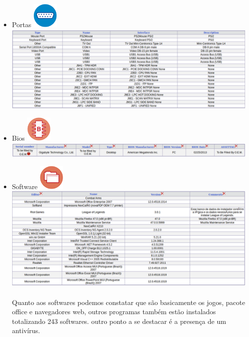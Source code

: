\documentclass[a4paper]{article}
\begin{document}
\begin{itemize}
    \item Portas \includegraphics[scale = 1.8]{ports.png}\\
  
  	\includegraphics[scale = 0.4]{portas.png}
    
    \item Bios \includegraphics[scale = 0.5]{bios.png}\\
  
  	\includegraphics[scale = 0.4]{bioo.png}
    
    \item Software \includegraphics[scale = 1.8]{software.png}\\
  
  	\includegraphics[scale = 0.4]{soft.png}
    \paragraph{}
    Quanto aos softwares podemos constatar que são basicamente os jogos, pacote office e navegadores web, outros programas também estão instalados totalizando 243 softwares. outro ponto a se destacar é a presença de um antivírus.
    

\end{itemize}
\end{document}
